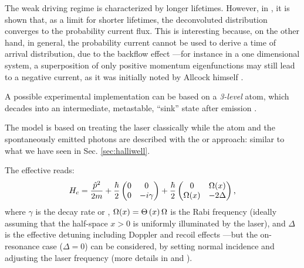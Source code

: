 The weak driving regime is characterized by longer lifetimes.
However, in \cite{Damborenea}, it is shown that,
as a limit for shorter lifetimes,
the deconvoluted distribution converges
to
the probability current flux.
This is interesting because, on the other hand, in general,
the probability current cannot be used to derive a time of arrival
distribution, due to the backflow effect
---for instance in a one dimensional system, a superposition of only positive momentum eigenfunctions may still lead to a
negative current, as it was initially noted by Allcock himself \parencite{Allcock-3}.

A possible experimental implementation can be based on a \emph{3-level} atom,
which decades into an intermediate, metastable,
``sink'' state after emission \parencite{Metastable, TQM2}.

The model is based on treating the laser classically
while the atom and the spontaneously emitted photons are
described with the  or 
approach: similar to what we have seen in Sec. \ref{sec:halliwell}.


The effective  reads:
\begin{equation}\label{eq:eff_atom_laser_detect_H}
  {H}_{c} = \frac{\hat{p}^2}{2m} +
  \frac{\hbar}{2} \left(
    \begin{matrix}
      0 & 0\\
      0 & -\iu\gamma
    \end{matrix}
  \right)
  +
  \frac{\hbar}{2} \left(
    \begin{matrix}%
      0         & \Omega(x)\\
      \Omega(x) & -2\Delta
    \end{matrix}
  \right)
  \text{,}
\end{equation}
where $\gamma$ is the decay rate or ,
$\Omega(x) = \Theta\left(x\right)\Omega$ is the Rabi frequency (ideally assuming that the half-space $x>0$ is uniformly illuminated by the laser),
and $\Delta$ is the effective detuning including Doppler and recoil effects
---but the on-resonance case ($\Delta=0$) can be considered,
by setting normal incidence and adjusting the laser frequency
(more details in \cite{Damborenea} and \cite[]{TQM2}).

